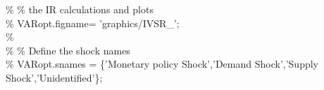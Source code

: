 \hspace{1mm}\hspace{5mm} \hspace{5mm} \hspace{5mm} \hspace{5mm} \hspace{5mm} \hspace{5mm} \hspace{5mm} \textcolor{matlabgreen}{\% }\textcolor{matlabgreen}{\% the IR calculations and plots }\\ 
\hspace{1mm}\hspace{5mm} \hspace{5mm} \hspace{5mm} \hspace{5mm} \hspace{5mm} \hspace{5mm} \hspace{5mm} \textcolor{matlabgreen}{\% VARopt.figname= 'graphics/IVSR\_'; }\\ 
\hspace{1mm}\hspace{5mm} \hspace{5mm} \hspace{5mm} \hspace{5mm} \hspace{5mm} \hspace{5mm} \hspace{5mm} \textcolor{matlabgreen}{\%  }\\ 
\hspace{1mm}\hspace{5mm} \hspace{5mm} \hspace{5mm} \hspace{5mm} \hspace{5mm} \hspace{5mm} \hspace{5mm} \textcolor{matlabgreen}{\% }\textcolor{matlabgreen}{\% Define the shock names }\\ 
\hspace{1mm}\hspace{5mm} \hspace{5mm} \hspace{5mm} \hspace{5mm} \hspace{5mm} \hspace{5mm} \hspace{5mm} \textcolor{matlabgreen}{\% VARopt.snames = \{'Monetary policy Shock','Demand Shock','Supply Shock','Unidentified'\}; }\\ 
